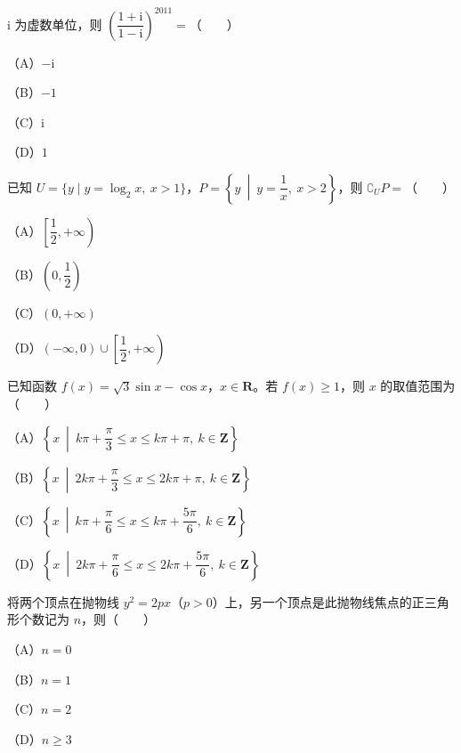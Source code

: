 

\begin{question}
$\mathrm i$ 为虚数单位，则 $\left(\dfrac{1+\mathrm i}{1-\mathrm i}\right)^{2011}=$\mbox{（　　）}

（A）$-\mathrm i$

（B）$-1$

（C）$\mathrm i$

（D）$1$

\end{question}
\begin{question}
已知 $U=\{y\mid y=\log_2x,\ x>1\}$，$P=\left\{y\ \middle|\ y=\dfrac1x,\ x>2\right\}$，则 $\complement_UP=$\mbox{（　　）}

（A）$\left[\dfrac12,+\infty\right)$

（B）$\left(0,\dfrac12\right)$

（C）$(0,+\infty)$

（D）$(-\infty,0)\cup\left[\dfrac12,+\infty\right)$

\end{question}
\begin{question}
已知函数 $f(x)=\sqrt3\sin x-\cos x$，$x\in\mathbf R$。若 $f(x)\geqslant1$，则 $x$ 的取值范围为\mbox{（　　）}

（A）$\left\{x\ \middle|\ k\pi+\dfrac\pi3\leqslant x\leqslant k\pi+\pi,\ k\in\mathbf Z\right\}$

（B）$\left\{x\ \middle|\ 2k\pi+\dfrac\pi3\leqslant x\leqslant2k\pi+\pi,\ k\in\mathbf Z\right\}$

（C）$\left\{x\ \middle|\ k\pi+\dfrac\pi6\leqslant x\leqslant k\pi+\dfrac{5\pi}6,\ k\in\mathbf Z\right\}$

（D）$\left\{x\ \middle|\ 2k\pi+\dfrac\pi6\leqslant x\leqslant2k\pi+\dfrac{5\pi}6,\ k\in\mathbf Z\right\}$

\end{question}
\begin{question}
将两个顶点在抛物线 $y^2=2px$（$p>0$）上，另一个顶点是此抛物线焦点的正三角形个数记为 $n$，则\mbox{（　　）}

（A）$n=0$

（B）$n=1$

（C）$n=2$

（D）$n\geqslant3$

\end{question}
